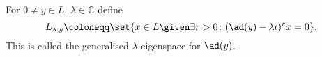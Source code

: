 For $0\neq y \in L$, $\lambda \in \mathbb{C}$ define
\[ L_{\lambda, y}\coloneqq \set{x \in L\given \exists r > 0\colon (\ad(y) - \lambda\iota)^rx = 0}. \]
This is called the generalised $\lambda$-eigenspace for $\ad(y)$.
